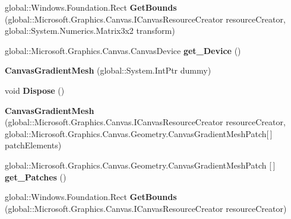 \begin{DoxyCompactItemize}
global\+::\+Windows.\+Foundation.\+Rect {\bfseries Get\+Bounds} (global\+::\+Microsoft.\+Graphics.\+Canvas.\+I\+Canvas\+Resource\+Creator resource\+Creator, global\+::\+System.\+Numerics.\+Matrix3x2 transform)
\item 
\mbox{\label{class_microsoft_1_1_graphics_1_1_canvas_1_1_geometry_1_1_canvas_gradient_mesh_aa06489c123c9a773e0a00e8dacd96bfd}} 
global\+::\+Microsoft.\+Graphics.\+Canvas.\+Canvas\+Device {\bfseries get\+\_\+\+Device} ()
\item 
\mbox{\label{class_microsoft_1_1_graphics_1_1_canvas_1_1_geometry_1_1_canvas_gradient_mesh_a7284f7e93f2c21e5bad79e6bbae86e49}} 
{\bfseries Canvas\+Gradient\+Mesh} (global\+::\+System.\+Int\+Ptr dummy)
\item 
\mbox{\label{class_microsoft_1_1_graphics_1_1_canvas_1_1_geometry_1_1_canvas_gradient_mesh_aff29d3a0c6889d589409c3bd3402cb7c}} 
void {\bfseries Dispose} ()
\item 
\mbox{\label{class_microsoft_1_1_graphics_1_1_canvas_1_1_geometry_1_1_canvas_gradient_mesh_a6677d365775f86d865af80a34d58b31d}} 
{\bfseries Canvas\+Gradient\+Mesh} (global\+::\+Microsoft.\+Graphics.\+Canvas.\+I\+Canvas\+Resource\+Creator resource\+Creator, global\+::\+Microsoft.\+Graphics.\+Canvas.\+Geometry.\+Canvas\+Gradient\+Mesh\+Patch\mbox{[}$\,$\mbox{]} patch\+Elements)
\item 
\mbox{\label{class_microsoft_1_1_graphics_1_1_canvas_1_1_geometry_1_1_canvas_gradient_mesh_ad14c223648421f65d2cbd4de1c1b0877}} 
global\+::\+Microsoft.\+Graphics.\+Canvas.\+Geometry.\+Canvas\+Gradient\+Mesh\+Patch \mbox{[}$\,$\mbox{]} {\bfseries get\+\_\+\+Patches} ()
\item 
\mbox{\label{class_microsoft_1_1_graphics_1_1_canvas_1_1_geometry_1_1_canvas_gradient_mesh_a3239426176127d3d80193f667dcd34f8}} 
global\+::\+Windows.\+Foundation.\+Rect {\bfseries Get\+Bounds} (global\+::\+Microsoft.\+Graphics.\+Canvas.\+I\+Canvas\+Resource\+Creator resource\+Creator)

\end{DoxyCompactItemize}
